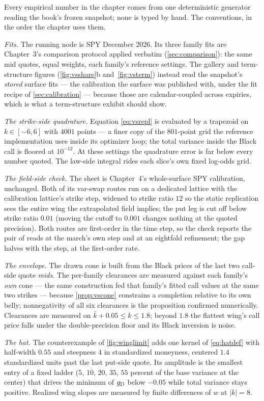 Every empirical number in the chapter comes from one deterministic
generator reading the book's frozen snapshot; none is typed by hand.
The conventions, in the order the chapter uses them.

\emph{Fits.}  The running node is SPY December 2026.  Its three
family fits are Chapter~3's comparison protocol applied verbatim
(\cref{sec:comparison}): the same mid quotes, equal weights, each
family's reference settings.  The gallery and term-structure figures
(\cref{fig:vsshare}b and~\ref{fig:vsterm}) instead read the
snapshot's \emph{stored} surface fits --- the calibration the surface
was published with, under the fit recipe of \cref{sec:calibration}
--- because those are calendar-coupled across expiries, which is
what a term-structure exhibit should show.

\emph{The strike-side quadrature.}  Equation \eqref{eq:vsrepl} is
evaluated by a trapezoid on $k\in[-6,6]$ with $4001$ points --- a
finer copy of the $801$-point grid the reference implementation uses
inside its optimizer loop; the total variance inside the Black
call is floored at $10^{-12}$.  At these settings the quadrature
error is far below every number quoted.  The law-side integral rides
each slice's own fixed log-odds grid.

\emph{The field-side check.}  The sheet is Chapter~4's whole-surface
SPY calibration, unchanged.  Both of its var-swap routes run on a
dedicated lattice with the calibration lattice's strike step, widened
to strike ratio $12$ so the static replication sees the entire wing
the extrapolated field implies; the put leg is cut off below strike
ratio $0.01$ (moving the cutoff to $0.001$ changes nothing at the
quoted precision).  Both routes are first-order in the time step, so
the check reports the pair of reads at the march's own step and at an
eightfold refinement; the gap halves with the step, at the
first-order rate.

\emph{The envelope.}  The drawn cone is built from the Black prices
of the last two call-side quote \emph{mids}.  The per-family
clearances are measured against each family's \emph{own} cone ---
the same construction fed that family's fitted call values at the
same two strikes --- because \cref{prop:vscone} constrains a
completion relative to its own belly; nonnegativity of all six
clearances is the proposition confirmed numerically.  Clearances are
measured on $\bar k+0.05\le k\le1.8$; beyond $1.8$ the flattest
wing's call price falls under the double-precision floor and its
Black inversion is noise.

\emph{The hat.}  The counterexample of \cref{fig:winglimit} adds one
kernel of \cref{eq:hatdef} with half-width $0.55$ and steepness $4$
in standardized moneyness, centered $1.4$ standardized units past
the last put-side quote.  Its amplitude is the smallest entry of a
fixed ladder ($5$, $10$, $20$, $35$, $55$ percent of the base
variance at the center) that drives the minimum of $g_{\rm D}$ below
$-0.05$ while total variance stays positive.  Realized wing slopes
are measured by finite differences of $w$ at $|k|=8$.

